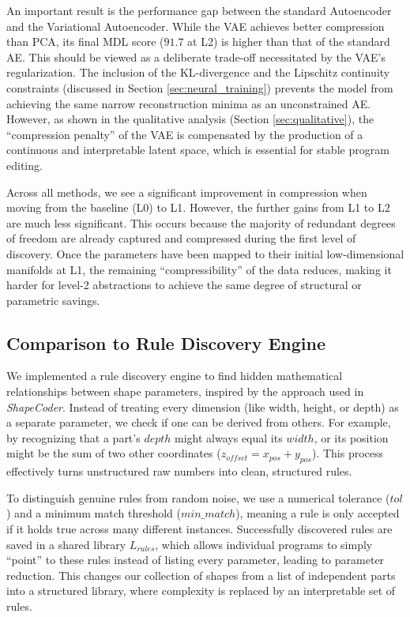 \documentclass{thesis}
\begin{document}
An important result is the performance gap between the standard Autoencoder and the Variational Autoencoder. While the VAE achieves better compression than PCA, its final MDL score ($91.7$ at L2) is higher than that of the standard AE. This should be viewed as a deliberate trade-off necessitated by the VAE's regularization. The inclusion of the KL-divergence and the Lipschitz continuity constraints (discussed in Section \ref{sec:neural_training}) prevents the model from achieving the same narrow reconstruction minima as an unconstrained AE. However, as shown in the qualitative analysis (Section \ref{sec:qualitative}), the ``compression penalty'' of the VAE is compensated by the production of a continuous and interpretable latent space, which is essential for stable program editing.

Across all methods, we see a significant improvement in compression when moving from the baseline (L0) to L1. However, the further gains from L1 to L2 are much less significant. This occurs because the majority of redundant degrees of freedom are already captured and compressed during the first level of discovery. Once the parameters have been mapped to their initial low-dimensional manifolds at L1, the remaining ``compressibility'' of the data reduces, making it harder for level-2 abstractions to achieve the same degree of structural or parametric savings.

\subsection{Comparison to Rule Discovery Engine}

We implemented a rule discovery engine to find hidden mathematical relationships between shape parameters, inspired by the approach used in \textit{ShapeCoder}. Instead of treating every dimension (like width, height, or depth) as a separate parameter, we check if one can be derived from others. For example, by recognizing that a part's $depth$ might always equal its $width$, or its position might be the sum of two other coordinates ($z_{offset} = x_{pos} + y_{pos}$). This process effectively turns unstructured raw numbers into clean, structured rules.

To distinguish genuine rules from random noise, we use a numerical tolerance ($tol$) and a minimum match threshold ($min\_match$), meaning a rule is only accepted if it holds true across many different instances. Successfully discovered rules are saved in a shared library $L_{rules}$, which allows individual programs to simply ``point'' to these rules instead of listing every parameter, leading to parameter reduction. This changes our collection of shapes from a list of independent parts into a structured library, where complexity is replaced by an interpretable set of rules.
\end{document}
